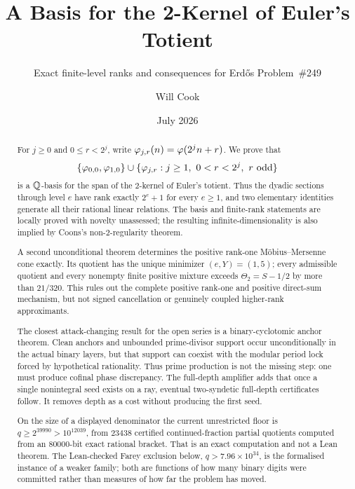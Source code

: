 \documentclass[11pt]{article}
\title{A Basis for the 2-Kernel of Euler's Totient}
\subtitle{Exact finite-level ranks and consequences for Erd\H{o}s
Problem~\#249}
\author{Will Cook}
\date{July 2026}
\newcommand{\Stot}{S}
\begin{document}
\maketitle
\noteprovenance

\begin{abstract}
\noindent
For
$j\ge0$ and $0\le r<2^j$, write $\varphi_{j,r}(n)=\varphi(2^jn+r)$.  We prove that
\[
  \{\varphi_{0,0},\varphi_{1,0}\}
  \cup
  \{\varphi_{j,r}:j\ge1,\ 0<r<2^j,\ r\ {\rm odd}\}
\]
is a $\mathbb{Q}$-basis for the span of the $2$-kernel of Euler's totient.  Thus the
dyadic sections through level $e$ have rank exactly $2^e+1$ for every $e\ge1$,
and two elementary identities generate all their rational linear relations.
The basis and finite-rank statements are locally proved with novelty
unassessed; the resulting infinite-dimensionality is also implied by Coons's
non-$2$-regularity theorem.

A second unconditional theorem determines the positive rank-one
M\"obius--Mersenne cone exactly.  Its quotient has the unique minimizer
$(e,Y)=(1,5)$; every admissible quotient and every nonempty finite positive
mixture exceeds $\Theta_2=\Stot-1/2$ by more than $21/320$.  This rules out the
complete positive rank-one and positive direct-sum mechanism, but not signed
cancellation or genuinely coupled higher-rank approximants.

The closest attack-changing result for the open series is a binary-cyclotomic
anchor theorem.  Clean anchors and unbounded prime-divisor support occur
unconditionally in the actual binary layers, but that support can coexist with
the modular period lock forced by hypothetical rationality.  Thus prime
production is not the missing step: one must produce cofinal phase
discrepancy.  The full-depth amplifier adds that once a single nonintegral seed
exists on a ray, eventual two-syndetic full-depth certificates follow.  It
removes depth as a cost without producing the first seed.

On the size of a displayed denominator the current unrestricted floor is
$q\ge2^{39990}>10^{12039}$, from $23438$ certified continued-fraction partial
quotients computed from an $80000$-bit exact rational bracket.  That is an
exact computation and not a Lean theorem.  The Lean-checked Farey exclusion
below, $q>7.96\times10^{34}$, is the formalised instance of a weaker family;
both are functions of how many binary digits were committed rather than
measures of how far the problem has moved.


\end{abstract}
\end{document}

